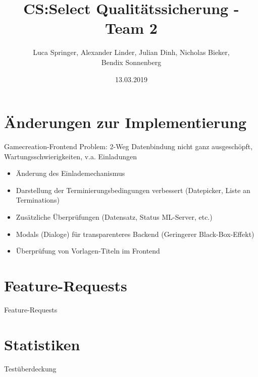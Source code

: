 \documentclass[xcolor=dvipsnames]{beamer}
\title[Team 2 - Implementierung]{CS:Select Qualitätssicherung - Team 2}
\author{Luca Springer, Alexander Linder, Julian Dinh, Nicholas Bieker,\\ Bendix Sonnenberg}
\date{13.03.2019}
\begin{document}
\begin{frame} %
  \titlepage
\end{frame}

\section{Änderungen zur Implementierung}
\begin{frame}{Gamecreation-Frontend}
    Problem: 2-Weg Datenbindung nicht ganz ausgeschöpft, Wartungsschwierigkeiten, v.a. Einladungen
    \begin{itemize}
        \item Änderung des Einlademechanismus
        \item Darstellung der Terminierungsbedingungen verbessert (Datepicker, Liste an Terminations)
        \item Zusätzliche Überprüfungen (Datensatz, Status ML-Server, etc.)
        \item Modals (Dialoge) für transparenteres Backend (Geringerer Black-Box-Effekt)
        \item Überprüfung von Vorlagen-Titeln im Frontend
    \end{itemize}
\end{frame}

\section{Feature-Requests}
\begin{frame}{Feature-Requests}
\end{frame}

\renewcommand{\arraystretch}{1.5}

\section{Statistiken}

\begin{frame}{Testüberdeckung}
    \centering
\end{frame}
\end{document}
